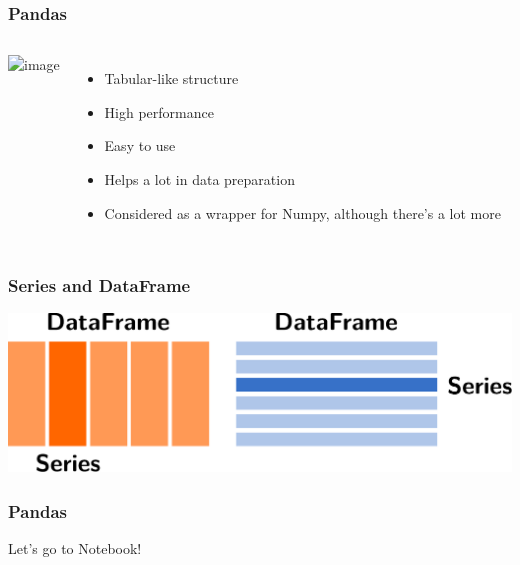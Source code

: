 \documentclass[aspectratio=169]{beamer}
\begin{document}
\begin{frame}
    \frametitle{Pandas}
    \begin{columns}
            \includegraphics<2->[width=\columnwidth]{images/pandas-logo.png}
            \begin{itemize}[<+(2)->]
                \item Tabular-like structure
                \item High performance
                \item Easy to use
                \item Helps a lot in data preparation
                \item Considered as a wrapper for Numpy, although there's a lot more
            \end{itemize}
    \end{columns}
\end{frame}

\begin{frame}
    \frametitle{Series and DataFrame}
    \includegraphics[width=\textwidth]{images/df-series.pdf}
\end{frame}

\begin{frame}
    \frametitle{Pandas}
    \centering
    { \Huge Let's go to Notebook! }
\end{frame}
\end{document}
